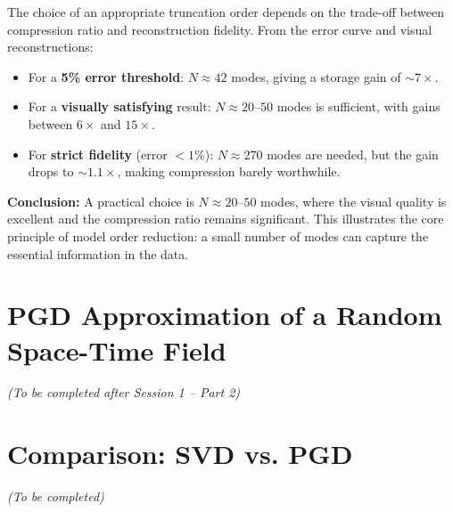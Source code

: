 \documentclass[11pt,a4paper]{article}
\begin{document}
The choice of an appropriate truncation order depends on the trade-off between compression ratio and reconstruction fidelity. From the error curve and visual reconstructions:

\begin{itemize}
    \item For a \textbf{5\% error threshold}: $N \approx 42$ modes, giving a storage gain of $\sim 7\times$.
    \item For a \textbf{visually satisfying} result: $N \approx 20$--$50$ modes is sufficient, with gains between $6\times$ and $15\times$.
    \item For \textbf{strict fidelity} (error $< 1\%$): $N \approx 270$ modes are needed, but the gain drops to $\sim 1.1\times$, making compression barely worthwhile.
\end{itemize}

\textbf{Conclusion:} A practical choice is $N \approx 20$--$50$ modes, where the visual quality is excellent and the compression ratio remains significant. This illustrates the core principle of model order reduction: a small number of modes can capture the essential information in the data.

\newpage

\section{PGD Approximation of a Random Space-Time Field}

\textit{(To be completed after Session 1 -- Part 2)}

\newpage

\section{Comparison: SVD vs. PGD}

\textit{(To be completed)}
\end{document}
